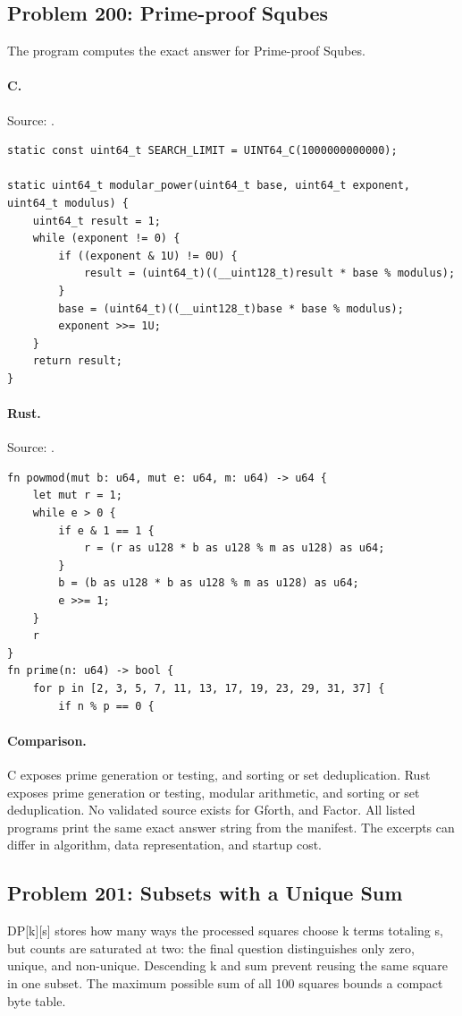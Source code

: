 \subsection{Problem 200: Prime-proof Squbes}
\label{walkthrough:p200}
The program computes the exact answer for Prime-proof Squbes.

\paragraph{C.} Source: .
\begin{lstlisting}
static const uint64_t SEARCH_LIMIT = UINT64_C(1000000000000);

static uint64_t modular_power(uint64_t base, uint64_t exponent, uint64_t modulus) {
    uint64_t result = 1;
    while (exponent != 0) {
        if ((exponent & 1U) != 0U) {
            result = (uint64_t)((__uint128_t)result * base % modulus);
        }
        base = (uint64_t)((__uint128_t)base * base % modulus);
        exponent >>= 1U;
    }
    return result;
}
\end{lstlisting}

\paragraph{Rust.} Source: .
\begin{lstlisting}
fn powmod(mut b: u64, mut e: u64, m: u64) -> u64 {
    let mut r = 1;
    while e > 0 {
        if e & 1 == 1 {
            r = (r as u128 * b as u128 % m as u128) as u64;
        }
        b = (b as u128 * b as u128 % m as u128) as u64;
        e >>= 1;
    }
    r
}
fn prime(n: u64) -> bool {
    for p in [2, 3, 5, 7, 11, 13, 17, 19, 23, 29, 31, 37] {
        if n % p == 0 {
\end{lstlisting}

\paragraph{Comparison.}
C exposes prime generation or testing, and sorting or set deduplication. Rust exposes prime generation or testing, modular arithmetic, and sorting or set deduplication.
No validated source exists for Gforth, and Factor.
All listed programs print the same exact answer string from the manifest. The excerpts can differ in algorithm, data representation, and startup cost.

\subsection{Problem 201: Subsets with a Unique Sum}
\label{walkthrough:p201}
DP[k][s] stores how many ways the processed squares choose k terms totaling s, but counts are saturated at two: the final question distinguishes only zero, unique, and non-unique. Descending k and sum prevent reusing the same square in one subset. The maximum possible sum of all 100 squares bounds a compact byte table.

